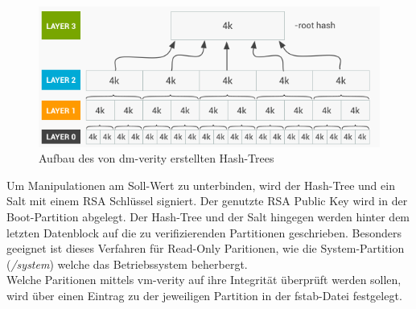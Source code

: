 	\begin{figure}[h]
		\centering
		\includegraphics[width=0.7\linewidth]{android_pages/graphics/dm-verity-table}
		\caption[Aufbau des Hash-Trees]{Aufbau des von dm-verity erstellten Hash-Trees\protect\cite{VerifiedBoot}}
		\label{fig:dm-verity-table}
	\end{figure}
	
\begin{flushleft}
	Um Manipulationen am Soll-Wert zu unterbinden, wird der Hash-Tree und ein Salt mit einem RSA Schlüssel signiert. Der genutzte RSA Public Key wird in der Boot-Partition abgelegt. Der Hash-Tree und der Salt hingegen werden hinter dem letzten Datenblock auf die zu verifizierenden Partitionen geschrieben. Besonders geeignet ist dieses Verfahren für Read-Only Paritionen, wie die System-Partition (\textit{/system}) welche das Betriebssystem beherbergt.\\
	Welche Paritionen mittels vm-verity auf ihre Integrität überprüft werden sollen, wird über einen Eintrag zu der jeweiligen Partition in der fstab-Datei festgelegt.
\end{flushleft}

